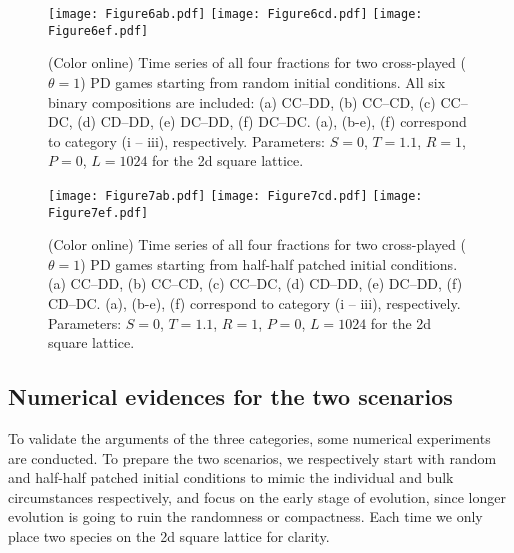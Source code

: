 \documentclass[showpacs,superscriptaddress,reprint,nofootinbib,amsmath,amssymb,aps,pre]{revtex4-1}
\begin{document}
 \begin{figure}[t]%
\centering
\texttt{[image: Figure6ab.pdf]}
\texttt{[image: Figure6cd.pdf]}
\texttt{[image: Figure6ef.pdf]}
\caption{(Color online)
Time series of all four fractions for two cross-played ($\theta=1$) PD games starting from random initial conditions.
All six binary compositions are included:
(a) CC--DD, (b) CC--CD, (c) CC--DC, (d) CD--DD, (e) DC--DD, (f) DC--DC. (a), (b-e), (f) correspond to category (i -- iii), respectively. 
Parameters: $S=0$, $T=1.1$, $R=1$, $P=0$, $L=1024$ for the 2d square lattice.
}
\label{fig:individual}
\end{figure}
 \begin{figure}[t]%
\centering
\texttt{[image: Figure7ab.pdf]}
\texttt{[image: Figure7cd.pdf]}
\texttt{[image: Figure7ef.pdf]}
\caption{(Color online)
Time series of all four fractions for two cross-played ($\theta=1$) PD games starting from half-half patched initial conditions. 
(a) CC--DD, (b) CC--CD, (c) CC--DC, (d) CD--DD, (e) DC--DD, (f) CD--DC. (a), (b-e), (f) correspond to category (i -- iii), respectively. 
Parameters: $S=0$, $T=1.1$, $R=1$, $P=0$, $L=1024$ for the 2d square lattice.
}
\label{fig:bulk}
\end{figure}
\subsection{Numerical evidences for the two scenarios}\label{subsec:evidence}
To validate the arguments of the three categories, some numerical experiments are conducted.  
To prepare the two scenarios, we respectively start with random and half-half patched initial conditions to mimic the individual and bulk circumstances respectively, and focus on the early stage of evolution, since longer evolution is going to ruin the randomness or compactness. Each time we only place two species on the 2d square lattice for clarity.
\end{document}
